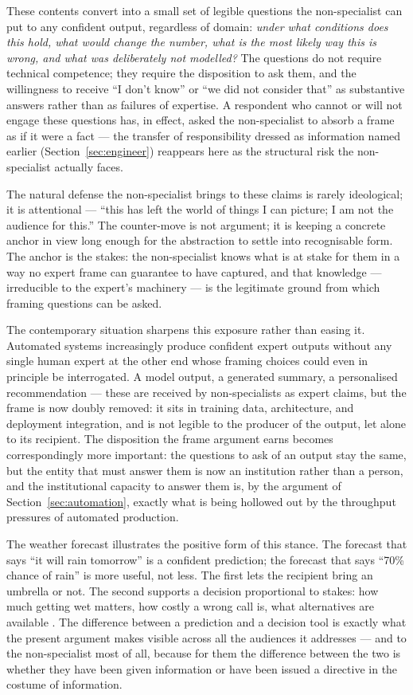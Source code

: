 \documentclass[11pt,a4paper]{article}
\begin{document}
These contents convert into a small set of legible questions the
non-specialist can put to any confident output, regardless of domain:
\emph{under what conditions does this hold, what would change the
number, what is the most likely way this is wrong, and what was
deliberately not modelled?} The questions do not require technical
competence; they require the disposition to ask them, and the
willingness to receive ``I don't know'' or ``we did not consider that''
as substantive answers rather than as failures of expertise. A
respondent who cannot or will not engage these questions has, in effect,
asked the non-specialist to absorb a frame as if it were a fact --- the
transfer of responsibility dressed as information named earlier
(Section~\ref{sec:engineer}) reappears here as the structural risk the
non-specialist actually faces.

The natural defense the non-specialist brings to these claims is rarely
ideological; it is attentional --- ``this has left the world of things I
can picture; I am not the audience for this.'' The counter-move is not
argument; it is keeping a concrete anchor in view long enough for the
abstraction to settle into recognisable form. The anchor is the stakes:
the non-specialist knows what is at stake for them in a way no expert
frame can guarantee to have captured, and that knowledge --- irreducible
to the expert's machinery --- is the legitimate ground from which
framing questions can be asked.

The contemporary situation sharpens this exposure rather than easing it.
Automated systems increasingly produce confident expert outputs without
any single human expert at the other end whose framing choices could
even in principle be interrogated. A model output, a generated summary,
a personalised recommendation --- these are received by non-specialists
as expert claims, but the frame is now doubly removed: it sits in
training data, architecture, and deployment integration, and is not
legible to the producer of the output, let alone to its recipient. The
disposition the frame argument earns becomes correspondingly more
important: the questions to ask of an output stay the same, but the
entity that must answer them is now an institution rather than a person,
and the institutional capacity to answer them is, by the argument of
Section~\ref{sec:automation}, exactly what is being hollowed out by the
throughput pressures of automated production.

The weather forecast illustrates the positive form of this stance. The
forecast that
says ``it will rain tomorrow'' is a confident prediction; the forecast
that says ``70\% chance of rain'' is more useful, not less. The first
lets the recipient bring an umbrella or not. The second supports a
decision proportional to stakes: how much getting wet matters, how
costly a wrong call is, what alternatives are available
\citep{Spiegelhalter2019,GneitingRaftery2007,TetlockGardner2015}. The
difference between a prediction and a decision tool is exactly what the
present argument makes visible across all the audiences it addresses
--- and to the non-specialist most of all, because for them the
difference between the two is whether they have been given information
or have been issued a directive in the costume of information.
\end{document}
